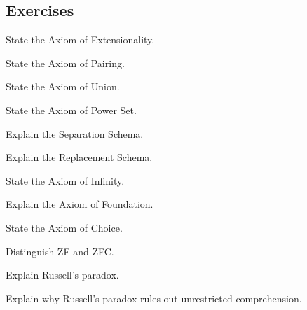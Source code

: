\subsection{Exercises}
\label{subsec:axiomatic-set-theory-exercises}

\begin{exercise}[1]
State the Axiom of Extensionality.
\end{exercise}

\begin{exercise}[1]
State the Axiom of Pairing.
\end{exercise}

\begin{exercise}[1]
State the Axiom of Union.
\end{exercise}

\begin{exercise}[1]
State the Axiom of Power Set.
\end{exercise}

\begin{exercise}[1]
Explain the Separation Schema.
\end{exercise}

\begin{exercise}[1]
Explain the Replacement Schema.
\end{exercise}

\begin{exercise}[1]
State the Axiom of Infinity.
\end{exercise}

\begin{exercise}[1]
Explain the Axiom of Foundation.
\end{exercise}

\begin{exercise}[1]
State the Axiom of Choice.
\end{exercise}

\begin{exercise}[1]
Distinguish ZF and ZFC.
\end{exercise}

\begin{exercise}[2]
Explain Russell's paradox.
\end{exercise}

\begin{exercise}[2]
Explain why Russell's paradox rules out unrestricted comprehension.
\end{exercise}

